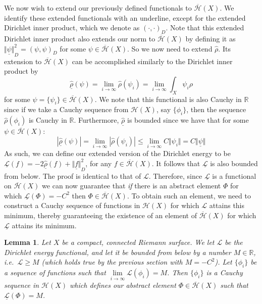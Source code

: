 \documentclass[11pt]{report}
\newtheorem{lemma}[thm]{Lemma}
\theoremstyle{definition}
\begin{document}
We now wish to extend our previously defined functionals to $\overline{\mathcal{H}}(X)$. We identify these extended functionals with an underline, except for the extended Dirichlet inner product, which we denote as $(\cdot, \cdot)_D$. Note that this extended Dirichlet inner product also extends our norm to $\overline{\mathcal{H}}(X)$ by defining it as $\underline{\Vert\psi\Vert}_D^2 = (\psi, \psi)_D$ for some $\psi \in \overline{\mathcal{H}}(X)$.
So we now need to extend $\hat{\rho}$. Its extension to $\overline{\mathcal{H}}(X)$ can be accomplished similarly to the Dirichlet inner product by
\[\underline{\hat{\rho}}(\psi) = \lim_{i \rightarrow \infty} \hat{\rho}(\psi_i) = \lim_{i \rightarrow \infty} \int_X \psi_i\rho\]
for some $\psi = \{\psi_i\} \in \overline{\mathcal{H}}(X)$. We note that this functional is also Cauchy in $\mathbb{R}$ since if we take a Cauchy sequence from $\mathcal{H}(X)$, say $\{\phi_i\}$, then the sequence $\hat{\rho}(\phi_i)$ is Cauchy in $\mathbb{R}$. Furthermore, $\underline{\hat{\rho}}$ is bounded since we have that for some $\psi \in \overline{\mathcal{H}}(X)$:
\[
  |\underline{\hat{\rho}}(\psi)| = \lim_{i \rightarrow \infty}|\hat{\rho}(\psi_i)| \leq \lim_{i \rightarrow \infty}C\Vert \psi_i \Vert = C\underline{\Vert \psi\Vert}
\]
As such, we can define our extended version of the Dirichlet energy to be
$\underline{\mathcal{L}}(f) =  -2\underline{\hat{\rho}}(f) + \underline{\Vert f \Vert}_D^2$, for any $f \in \overline{\mathcal{H}}(X)$. It follows that $\underline{\mathcal{L}}$ is also bounded from below. The proof is identical to that of $\mathcal{L}$. Therefore, since $\underline{\mathcal{L}}$ is a functional on $\overline{\mathcal{H}}(X)$ we can now guarantee that \emph{if} there is an abstract element $\Phi$ for which $\underline{\mathcal{L}}(\Phi) = -C^2$ then $\Phi \in \overline{\mathcal{H}}(X)$. To obtain such an element, we need to construct a Cauchy sequence of functions in $\mathcal{H}(X)$ for which $\mathcal{L}$ attains this minimum, thereby guaranteeing the existence of an element of $\overline{\mathcal{H}}(X)$ for which $\underline{\mathcal{L}}$ attains its minimum.
\begin{lemma}
  Let $X$ be a compact, connected Riemann surface. We let $\mathcal{L}$ be the Dirichlet energy functional, and let it be bounded from below by a number $M \in \mathbb{R}$, i.e.\ $\mathcal{L} \geq M$ (which holds true by the previous section with $M=-C^2$).
  Let $\{\phi_i\}$ be a sequence of functions such that $\lim\limits_{i \rightarrow \infty}\mathcal{L}(\phi_i) = M$. Then $\{\phi_i\}$ is a Cauchy sequence in $\mathcal{H}(X)$ which defines our abstract element $\Phi \in \overline{\mathcal{H}}(X)$ such that $\underline{\mathcal{L}}(\Phi) = M$.
\end{lemma}
\end{document}

